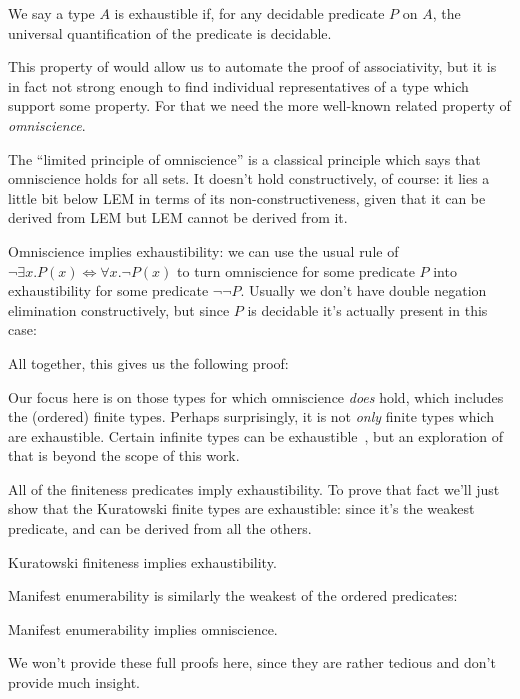 We say a type \(A\) is exhaustible if, for any decidable predicate \(P\) on
\(A\), the universal quantification of the predicate is decidable.

This property of  would allow us to automate the proof of
associativity, but it is in fact not strong enough to find individual
representatives of a type which support some property.
For that we need the more well-known related property of
\emph{omniscience}.


The ``limited principle of omniscience''
\citep{bishopFoundationsConstructiveAnalysis1967} is a classical principle which
says that omniscience holds for all sets.
It doesn't hold constructively, of course: it lies a little bit below LEM in
terms of its non-constructiveness, given that it can be derived from LEM but LEM
cannot be derived from it.

Omniscience implies exhaustibility: we can use the usual rule of \(\neg \exists x. P(x) \iff \forall x. \neg P(x) \)
to turn omniscience for some predicate \(P\) into exhaustibility for some
predicate \(\neg \neg P\).
Usually we don't have double negation elimination constructively, but since
\(P\) is decidable it's actually present in this case:


All together, this gives us the following proof:



Our focus here is on those types for which omniscience \emph{does} hold,
which includes the (ordered) finite types.
Perhaps surprisingly, it is not \emph{only} finite types which are exhaustible.
Certain infinite types can be
exhaustible~\citep{escardoInfiniteSetsThat2007}, but an exploration of that is
beyond the scope of this work.

All of the finiteness predicates imply exhaustibility.
To prove that fact we'll just show that the Kuratowski finite types are
exhaustible: since it's the weakest predicate, and can be derived from all the
others.
\begin{lemma}
  Kuratowski finiteness implies exhaustibility.
\end{lemma}
Manifest enumerability is similarly the weakest of the ordered predicates:
\begin{lemma}
  Manifest enumerability implies omniscience.
\end{lemma}
We won't provide these full proofs here, since they are rather tedious and don't
provide much insight.

